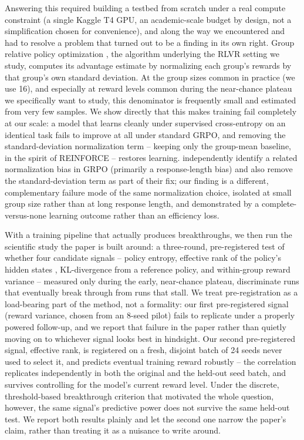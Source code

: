 \documentclass{article}
\begin{document}
Answering this required building a testbed from scratch under a real compute
constraint (a single Kaggle T4 GPU, an academic-scale budget by design, not a
simplification chosen for convenience), and along the way we encountered and had
to resolve a problem that turned out to be a finding in its own right. Group
relative policy optimization \citep[GRPO;][]{shao2024deepseekmath}, the
algorithm underlying the RLVR setting we study, computes its advantage estimate
by normalizing each group's rewards by that group's own standard deviation. At
the group sizes common in practice (we use 16), and especially at reward levels
common during the near-chance plateau we specifically want to study, this
denominator is frequently small and estimated from very few samples. We show
directly that this makes training fail completely at our scale: a model that
learns cleanly under supervised cross-entropy on an identical task fails to
improve at all under standard GRPO, and removing the standard-deviation
normalization term -- keeping only the group-mean baseline, in the spirit of
REINFORCE \citep{williams1992reinforce} -- restores learning. \citet{liu2025understanding}
independently identify a related normalization bias in GRPO (primarily a
response-length bias) and also remove the standard-deviation term as part of
their fix; our finding is a different, complementary failure mode of the same
normalization choice, isolated at small group size rather than at long response
length, and demonstrated by a complete-versus-none learning outcome rather than
an efficiency loss.

With a training pipeline that actually produces breakthroughs, we then run the
scientific study the paper is built around: a three-round, pre-registered test
of whether four candidate signals -- policy entropy, effective rank of the
policy's hidden states \citep{roy2007effective}, KL-divergence from a reference
policy, and within-group reward variance -- measured only during the early,
near-chance plateau, discriminate runs that eventually break through from runs
that stall. We treat pre-registration as a load-bearing part of the method, not
a formality: our first pre-registered signal (reward variance, chosen from an
8-seed pilot) fails to replicate under a properly powered follow-up, and we
report that failure in the paper rather than quietly moving on to whichever
signal looks best in hindsight. Our second pre-registered signal, effective
rank, is registered on a fresh, disjoint batch of 24 seeds never used to select
it, and predicts eventual training reward robustly -- the correlation replicates
independently in both the original and the held-out seed batch, and survives
controlling for the model's current reward level. Under the discrete,
threshold-based breakthrough criterion that motivated the whole question,
however, the same signal's predictive power does not survive the same
held-out test. We report both results plainly and let the second one narrow
the paper's claim, rather than treating it as a nuisance to write around.
\end{document}
